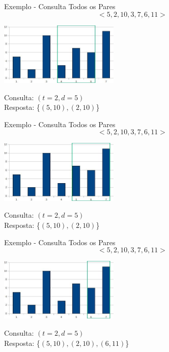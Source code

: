 \documentclass{beamer}
\begin{document}
\begin{frame}{Exemplo - Consulta Todos os Pares}
$$<5, 2, 10, 3, 7, 6, 11>$$
\begin{center}
\includegraphics[height=3.0cm]{g4.jpg}
\end{center}
Consulta: $(t = 2, d = 5)$
\\
Resposta: \{$(5, 10), (2, 10)$\}
\end{frame}

\begin{frame}{Exemplo - Consulta Todos os Pares}
$$<5, 2, 10, 3, 7, 6, 11>$$
\begin{center}
\includegraphics[height=3.0cm]{g5.jpg}
\end{center}
Consulta: $(t = 2, d = 5)$
\\
Resposta: \{$(5, 10), (2, 10)$\}
\end{frame}

\begin{frame}{Exemplo - Consulta Todos os Pares}
$$<5, 2, 10, 3, 7, 6, 11>$$
\begin{center}
\includegraphics[height=3.0cm]{g6.jpg}
\end{center}
Consulta: $(t = 2, d = 5)$
\\
Resposta: \{$(5, 10), (2, 10),(6, 11)$\}
\end{frame}
\end{document}
